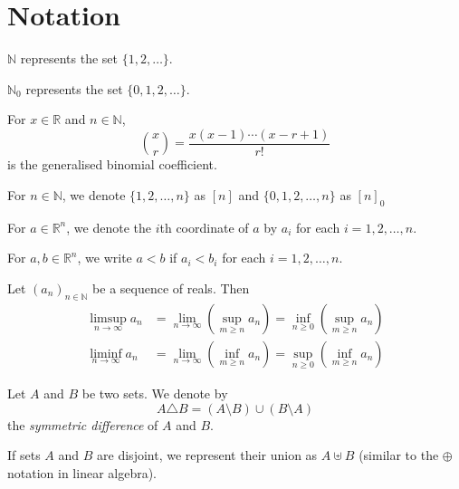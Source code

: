 \section{Notation}

$\mathbb{N}$ represents the set $\{1,2,\ldots\}$.

\vspace{1mm}
$\mathbb{N}_0$ represents the set $\{0,1,2,\ldots\}$.

\vspace{1mm}
For $x\in\mathbb{R}$ and $n\in\mathbb{N}$,
$$\binom{x}{r}=\frac{x(x-1)\cdots(x-r+1)}{r!}$$
is the generalised binomial coefficient.

\vspace{2mm}
For $n\in\mathbb{N}$, we denote $\{1,2,\ldots,n\}$ as $[n]$ and $\{0,1,2,\ldots,n\}$ as $[n]_0$

\vspace{2mm}
For $a\in\mathbb{R}^n$, we denote the $i$th coordinate of $a$ by $a_i$ for each $i=1,2,\ldots,n$.

\vspace{1mm}
For $a,b\in\mathbb{R}^n$, we write $a<b$ if $a_i<b_i$ for each $i=1,2,\ldots,n$.

\vspace{2mm}
Let $(a_n)_{n\in\mathbb{N}}$ be a sequence of reals. Then
\begin{align*}
    \limsup_{n\to\infty}a_n &= \lim_{n\to\infty}\left(\sup_{m\geq n}a_n\right) =    \inf_{n\geq 0}\left(\sup_{m\geq n}a_n\right) \\
    \liminf_{n\to\infty}a_n &= \lim_{n\to\infty}\left(\inf_{m\geq n}a_n\right) =    \sup_{n\geq 0}\left(\inf_{m\geq n}a_n\right)
\end{align*}

\vspace{2mm}
Let $A$ and $B$ be two sets. We denote by
$$A\triangle B=(A\setminus B)\cup(B\setminus A)$$
the \textit{symmetric difference} of $A$ and $B$.

\vspace{2mm}
If sets $A$ and $B$ are disjoint, we represent their union as $A\uplus B$ (similar to the $\oplus$ notation in linear algebra).   

\clearpage